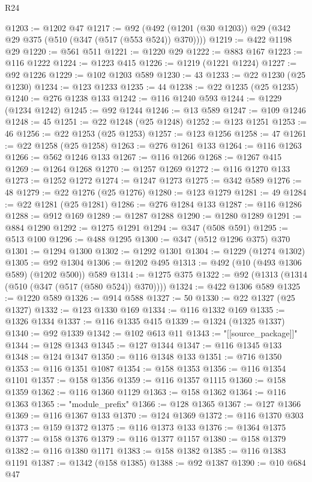 \begin{lexlean}{R24}
\begin{coremodule}
@1203 := @1202 @47
@1217 := @92 (@492 (@1201 (@30 @1203)) @29 (@342 @29 @375 (@510 (@347 (@517 (@553 @524)) @370))))
@1219 := @422 @1198 @29
@1220 := @561 @511
@1221 := @1220 @29
@1222 := @883 @167
@1223 := @116 @1222
@1224 := @1223 @415
@1226 := @1219 (@1221 @1224)
@1227 := @92 @1226
@1229 := @102 @1203 @589
@1230 := 43
@1233 := @22 @1230 (@25 @1230)
@1234 := @123 @1233
@1235 := 44
@1238 := @22 @1235 (@25 @1235)
@1240 := @276 @1238 @133
@1242 := @116 @1240 @593
@1244 := @1229 (@1234 @1242)
@1245 := @92 @1244
@1246 := @13 @589
@1247 := @109 @1246
@1248 := 45
@1251 := @22 @1248 (@25 @1248)
@1252 := @123 @1251
@1253 := 46
@1256 := @22 @1253 (@25 @1253)
@1257 := @123 @1256
@1258 := 47
@1261 := @22 @1258 (@25 @1258)
@1263 := @276 @1261 @133
@1264 := @116 @1263
@1266 := @562 @1246 @133
@1267 := @116 @1266
@1268 := @1267 @415
@1269 := @1264 @1268
@1270 := @1257 @1269
@1272 := @116 @1270 @133
@1273 := @1252 @1272
@1274 := @1247 @1273
@1275 := @342 @589
@1276 := 48
@1279 := @22 @1276 (@25 @1276)
@1280 := @123 @1279
@1281 := 49
@1284 := @22 @1281 (@25 @1281)
@1286 := @276 @1284 @133
@1287 := @116 @1286
@1288 := @912 @169
@1289 := @1287 @1288
@1290 := @1280 @1289
@1291 := @884 @1290
@1292 := @1275 @1291
@1294 := @347 (@508 @591)
@1295 := @513 @100
@1296 := @488 @1295
@1300 := @347 (@512 @1296 @375) @370
@1301 := @1294 @1300
@1302 := @1292 @1301
@1304 := @1229 (@1274 @1302)
@1305 := @92 @1304
@1306 := @1202 @495
@1313 := @492 (@10 (@493 @1306 @589) (@1202 @500)) @589
@1314 := @1275 @375
@1322 := @92 (@1313 (@1314 (@510 (@347 (@517 (@580 @524)) @370))))
@1324 := @422 @1306 @589
@1325 := @1220 @589
@1326 := @914 @588
@1327 := 50
@1330 := @22 @1327 (@25 @1327)
@1332 := @123 @1330 @169
@1334 := @116 @1332 @169
@1335 := @1326 @1334
@1337 := @116 @1335 @415
@1339 := @1324 (@1325 @1337)
@1340 := @92 @1339
@1342 := @102 @613 @11
@1343 := "[[source_package]]"
@1344 := @128 @1343
@1345 := @127 @1344
@1347 := @116 @1345 @133
@1348 := @124 @1347
@1350 := @116 @1348 @133
@1351 := @716 @1350
@1353 := @116 @1351 @1087
@1354 := @158 @1353
@1356 := @116 @1354 @1101
@1357 := @158 @1356
@1359 := @116 @1357 @1115
@1360 := @158 @1359
@1362 := @116 @1360 @1129
@1363 := @158 @1362
@1364 := @116 @1363
@1365 := "module_prefix"
@1366 := @128 @1365
@1367 := @127 @1366
@1369 := @116 @1367 @133
@1370 := @124 @1369
@1372 := @116 @1370 @303
@1373 := @159 @1372
@1375 := @116 @1373 @133
@1376 := @1364 @1375
@1377 := @158 @1376
@1379 := @116 @1377 @1157
@1380 := @158 @1379
@1382 := @116 @1380 @1171
@1383 := @158 @1382
@1385 := @116 @1383 @1191
@1387 := @1342 (@158 @1385)
@1388 := @92 @1387
@1390 := @10 @684 @47

\end{coremodule}
\end{lexlean}

